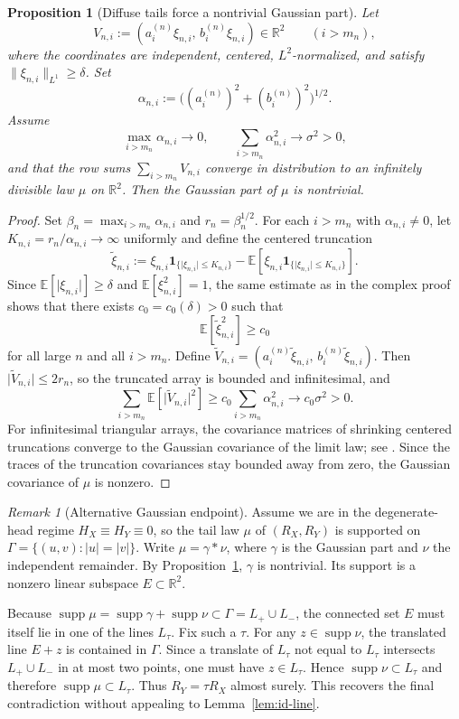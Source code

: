 \documentclass[11pt]{amsart}
\numberwithin{equation}{section}
\newtheorem{proposition}[theorem]{Proposition}
\theoremstyle{definition}
\theoremstyle{remark}
\newtheorem{remark}[theorem]{Remark}
\newcommand{\E}{\mathbb E}
\newcommand{\R}{\mathbb R}
\newcommand{\supp}{\operatorname{supp}}
\newcommand{\abs}[1]{\lvert #1 \rvert}
\newcommand{\norm}[1]{\lVert #1 \rVert}
\begin{document}
\begin{proposition}[Diffuse tails force a nontrivial Gaussian part]
\label{prop:gaussian-part}
Let
\[
V_{n,i}:=(a_i^{(n)}\xi_{n,i},\,b_i^{(n)}\xi_{n,i})\in\R^2
\qquad(i>m_n),
\]
where the coordinates are independent, centered, $L^2$-normalized, and satisfy
$\norm{\xi_{n,i}}_{L^1}\ge \delta$.  Set
\[
\alpha_{n,i}:=\bigl((a_i^{(n)})^2+(b_i^{(n)})^2\bigr)^{1/2}.
\]
Assume
\[
\max_{i>m_n}\alpha_{n,i}\to0,
\qquad
\sum_{i>m_n}\alpha_{n,i}^2\to \sigma^2>0,
\]
and that the row sums $\sum_{i>m_n}V_{n,i}$ converge in distribution to an
infinitely divisible law $\mu$ on $\R^2$.  Then the Gaussian part of $\mu$ is
nontrivial.
\end{proposition}

\begin{proof}
Set $\beta_n=\max_{i>m_n}\alpha_{n,i}$ and $r_n=\beta_n^{1/2}$.  For each
$i>m_n$ with $\alpha_{n,i}\ne0$, let $K_{n,i}=r_n/\alpha_{n,i}\to\infty$
uniformly and define the centered truncation
\[
\widetilde\xi_{n,i}
:=
\xi_{n,i}\mathbf 1_{\{\abs{\xi_{n,i}}\le K_{n,i}\}}
-\E[\xi_{n,i}\mathbf 1_{\{\abs{\xi_{n,i}}\le K_{n,i}\}}].
\]
Since $\E[\abs{\xi_{n,i}}]\ge\delta$ and $\E[\xi_{n,i}^2]=1$, the same estimate
as in the complex proof shows that there exists $c_0=c_0(\delta)>0$ such that
\[
\E[\widetilde\xi_{n,i}^2]\ge c_0
\]
for all large $n$ and all $i>m_n$.  Define
$\widetilde V_{n,i}=(a_i^{(n)}\widetilde\xi_{n,i},\,b_i^{(n)}\widetilde\xi_{n,i})$.
Then $\abs{\widetilde V_{n,i}}\le 2r_n$, so the truncated array is bounded and
infinitesimal, and
\[
\sum_{i>m_n}\E[\abs{\widetilde V_{n,i}}^2]
\ge c_0\sum_{i>m_n}\alpha_{n,i}^2
\longrightarrow c_0\sigma^2>0.
\]
For infinitesimal triangular arrays, the covariance matrices of shrinking
centered truncations converge to the Gaussian covariance of the limit law; see
\cite[Chapter~IV]{gnedenko-kolmogorov}.  Since the traces of the truncation
covariances stay bounded away from zero, the Gaussian covariance of $\mu$ is
nonzero.
\end{proof}

\begin{remark}[Alternative Gaussian endpoint]\label{rem:gaussian-endpoint}
Assume we are in the degenerate-head regime $H_X\equiv H_Y\equiv0$, so the
tail law $\mu$ of $(R_X,R_Y)$ is supported on $\Gamma=\{(u,v):\abs{u}=\abs{v}\}$.
Write $\mu=\gamma*\nu$, where $\gamma$ is the Gaussian part and $\nu$ the
independent remainder.  By Proposition~\ref{prop:gaussian-part}, $\gamma$ is
nontrivial.  Its support is a nonzero linear subspace $E\subset\R^2$.

Because $\supp\mu=\supp\gamma+\supp\nu\subset\Gamma=L_+\cup L_-$, the
connected set $E$ must itself lie in one of the lines $L_\tau$.  Fix such a
$\tau$.  For any $z\in\supp\nu$, the translated line $E+z$ is contained in
$\Gamma$.  Since a translate of $L_\tau$ not equal to $L_\tau$ intersects
$L_+\cup L_-$ in at most two points, one must have $z\in L_\tau$.  Hence
$\supp\nu\subset L_\tau$ and therefore $\supp\mu\subset L_\tau$.  Thus
$R_Y=\tau R_X$ almost surely.  This recovers the final contradiction without
appealing to Lemma~\ref{lem:id-line}.
\end{remark}
\end{document}
